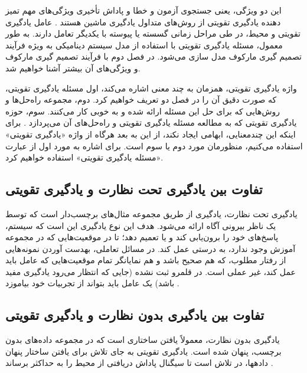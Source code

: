 

 
 

این دو ویژگی،  یعنی جستجوی آزمون و خطا و پاداش تأخیری ویژگی‌های مهم تمیز دهنده یادگیری تقویتی از روش‌های متداول یادگیری ماشین هستند \cite{suttonbook}.
 عامل یادگیری تقویتی و محیط، در طی مراحل زمانی گسسته یا پیوسته با یکدیگر تعامل دارند. به طور معمول، مسئله یادگیری تقویتی با استفاده از مدل سیستم دینامیکی به ویژه فرآیند تصمیم گیری مارکوف مدل سازی می‌شود. در فصل دوم با فرآیند تصمیم گیری مارکوف و ویژگی‌های آن بیشتر آشنا خواهیم شد.

واژه یادگیری تقویتی، همزمان به چند معنی اشاره می‌کند، اول مسئله یادگیری تقویتی، که صورت دقیق آن را در فصل دو تعریف خواهیم کرد. دوم، مجموعه راه‌حل‌ها و روش‌هایی که برای حل این مسئله ارائه شده و به خوبی کار می‌کنند. سوم، حوزه یادگیری تقویتی که به مطالعه مسئله یادگیری تقویتی و راه‌حل‌های آن می‌پردازد
\cite{suttonbook}.
 برای اینکه این چندمعنایی، ابهامی ایجاد نکند، از این به بعد هرگاه از واژه «یادگیری تقویتی» استفاده می‌کنیم، منظورمان  مورد دوم یا سوم است. برای اشاره به مورد اول از عبارت «مسئله یادگیری تقویتی» استفاده خواهیم کرد. 



\subsection*{تفاوت بین یادگیری تحت نظارت و یادگیری تقویتی}
یادگیری تحت نظارت، یادگیری از طریق مجموعه مثال‌های برچسب‌دار است که توسط یک ناظر بیرونی آگاه ارائه می‌شود. هدف این نوع یادگیری این است که سیستم، پاسخ‌های خود را برون‌یابی کند و یا تعمیم دهد؛ تا در موقعیت‌هایی که در مجموعه آموزش وجود ندارد، به درستی عمل کند. در مسائل تعاملی، به\nf دست آوردن نمونه‌هایی از رفتار مطلوب، که هم صحیح باشد و هم نمایانگر تمام موقعیت‌هایی که عامل باید عمل کند، غیر عملی است. در قلمرو ثبت نشده (جایی که انتظار می‌رود یادگیری مفید باشد) یک عامل باید بتواند از تجربیات خود بیاموزد
\cite{suttonbook}.

\subsection*{تفاوت بین یادگیری بدون نظارت و یادگیری تقویتی}
یادگیری بدون نظارت، معمولاً یافتن ساختاری است که در مجموعه داده‌های بدون برچسب، پنهان شده است. یادگیری تقویتی به جای تلاش برای یافتن ساختار پنهان داده\nf ها، در تلاش است تا سیگنال پاداش دریافتی از محیط را به حداکثر برساند
\cite{suttonbook}.


